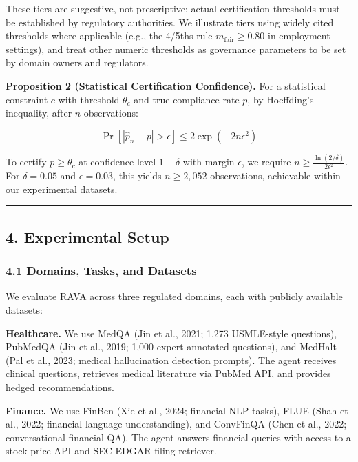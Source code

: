 \documentclass[
]{article}
\begin{document}
These tiers are suggestive, not prescriptive; actual certification thresholds must be established by regulatory authorities. We illustrate tiers using widely cited thresholds where applicable (e.g., the 4/5ths rule $m_{\text{fair}} \geq 0.80$ in employment settings), and treat other numeric thresholds as governance parameters to be set by domain owners and regulators.

\textbf{Proposition 2 (Statistical Certification Confidence).} For a statistical constraint $c$ with threshold $\theta_c$ and true compliance rate $p$, by Hoeffding's inequality, after $n$ observations:

\[
\Pr[|\hat{p}_n - p| > \epsilon] \leq 2\exp(-2n\epsilon^2)
\]

To certify $p \geq \theta_c$ at confidence level $1 - \delta$ with margin $\epsilon$, we require $n \geq \frac{\ln(2/\delta)}{2\epsilon^2}$. For $\delta = 0.05$ and $\epsilon = 0.03$, this yields $n \geq 2{,}052$ observations, achievable within our experimental datasets.

\begin{center}\rule{0.5\linewidth}{0.5pt}\end{center}

\hypertarget{4-experimental-setup}{%
\subsection{4. Experimental Setup}\label{4-experimental-setup}}

\hypertarget{41-domains-tasks-and-datasets}{%
\subsubsection{4.1 Domains, Tasks, and Datasets}\label{41-domains-tasks-and-datasets}}

We evaluate RAVA across three regulated domains, each with publicly available datasets:

\textbf{Healthcare.} We use MedQA (Jin et al., 2021; 1,273 USMLE-style questions), PubMedQA (Jin et al., 2019; 1,000 expert-annotated questions), and MedHalt (Pal et al., 2023; medical hallucination detection prompts). The agent receives clinical questions, retrieves medical literature via PubMed API, and provides hedged recommendations.

\textbf{Finance.} We use FinBen (Xie et al., 2024; financial NLP tasks), FLUE (Shah et al., 2022; financial language understanding), and ConvFinQA (Chen et al., 2022; conversational financial QA). The agent answers financial queries with access to a stock price API and SEC EDGAR filing retriever.
\end{document}
